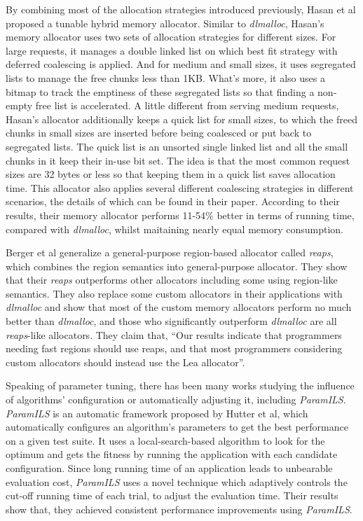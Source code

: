 By combining most of the allocation strategies introduced previously, Hasan et al\cite{Hasan20061051} proposed a tunable hybrid memory allocator. Similar to \emph{dlmalloc}, Hasan's memory allocator uses two sets of allocation strategies for different sizes. For large requests, it manages a double linked list on which best fit strategy with deferred coalescing is applied. And for medium and small sizes, it uses segregated lists to manage the free chunks less than 1KB. What's more, it also uses a bitmap to track the emptiness of these segregated lists so that finding a non-empty free list is accelerated. A little different from serving medium requests, Hasan's allocator additionally keeps a quick list for small sizes, to which the freed chunks in small sizes are inserted before being coalesced or put back to segregated lists. The quick list is an unsorted single linked list and all the small chunks in it keep their in-use bit set. The idea is that the most common request sizes are 32 bytes or less\cite{Zorn:1992:EMS:142181.142200} so that keeping them in a quick list saves allocation time. This allocator also applies several different coalescing strategies in different scenarios, the details of which can be found in their paper. According to their results, their memory allocator performs 11-54\% better in terms of running time, compared with \emph{dlmalloc}, whilst maitaining nearly equal memory consumption.

Berger et al\cite{Berger:2002:RCM:583854.582421} generalize a general-purpose region-based allocator called \emph{reaps}, which combines the region semantics into general-purpose allocator. They show that their \emph{reaps} outperforms other allocators including some using region-like semantics. They also replace some custom allocators in their applications with \emph{dlmalloc} and show that most of the custom memory allocators perform no much better than \emph{dlmalloc}, and those who significantly outperform \emph{dlmalloc} are all \emph{reaps}-like allocators. They claim that, ``Our results indicate that programmers needing fast regions should use reaps, and that most programmers considering custom allocators should instead use the Lea allocator''.

Speaking of parameter tuning, there has been many works studying the influence of algorithms' configuration or automatically adjusting it, including \emph{ParamILS}\cite{hutter2009paramils}. \emph{ParamILS} is an automatic framework proposed by Hutter et al, which automatically configures an algorithm's parameters to get the best performance on a given test suite. It uses a local-search-based algorithm to look for the optimum and gets the fitness by running the application with each candidate configuration. Since long running time of an application leads to unbearable evaluation cost, \emph{ParamILS} uses a novel technique which adaptively controls the cut-off running time of each trial, to adjust the evaluation time. Their results show that, they achieved consistent performance improvements using \emph{ParamILS}.

